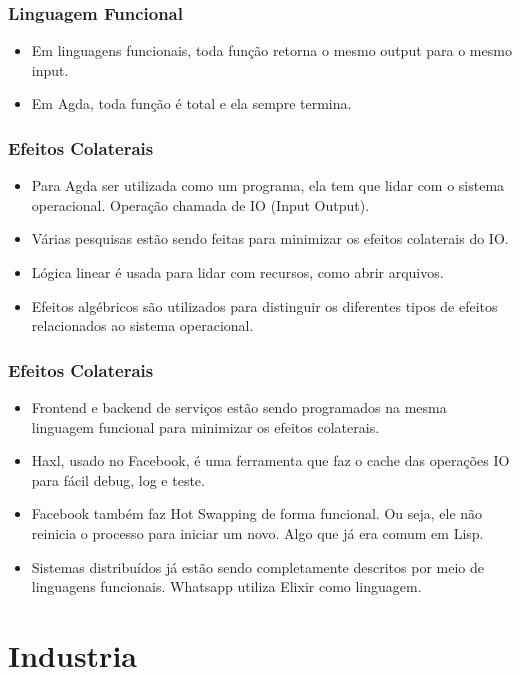 \documentclass{beamer}
\begin{document}
\begin{frame}
\frametitle{Linguagem Funcional}
\begin{itemize}
  \item Em linguagens funcionais, toda função retorna o mesmo output para o mesmo input.
  \item Em Agda, toda função é total e ela sempre termina.
\end{itemize}
\end{frame}

\begin{frame}
\frametitle{Efeitos Colaterais}
\begin{itemize}
  \item Para Agda ser utilizada como um programa, ela tem que lidar com o sistema operacional.
    Operação chamada de IO (Input Output).
  \item Várias pesquisas estão sendo feitas para minimizar os efeitos colaterais do IO.
  \item Lógica linear é usada para lidar com recursos, como abrir arquivos.
  \item Efeitos algébricos são utilizados para distinguir os diferentes tipos de efeitos
    relacionados ao sistema operacional.
\end{itemize}
\end{frame}

\begin{frame}
\frametitle{Efeitos Colaterais}
\begin{itemize}
  \item Frontend e backend de serviços estão sendo programados na mesma linguagem funcional
    para minimizar os efeitos colaterais.
  \item Haxl, usado no Facebook, é uma ferramenta que faz o cache das operações IO para
    fácil debug, log e teste.
  \item Facebook também faz Hot Swapping de forma funcional.
    Ou seja, ele não reinicia o processo para iniciar um novo.
    Algo que já era comum em Lisp.
  \item Sistemas distribuídos já estão sendo completamente descritos por meio de linguagens funcionais.
    Whatsapp utiliza Elixir como linguagem.
\end{itemize}
\end{frame}

\section{Industria}
\end{document}
